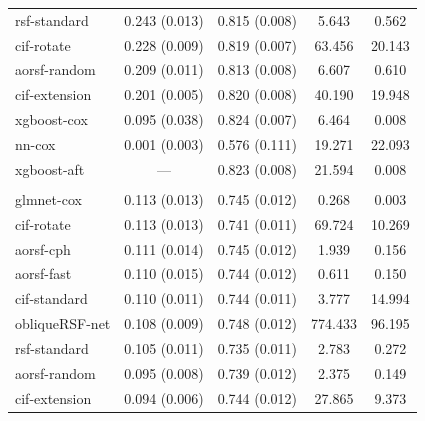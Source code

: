 \documentclass[12pt]{article}\usepackage[]{graphicx}\usepackage[]{xcolor}
\newenvironment{knitrout}{}{} %
\begin{document}
\begin{knitrout}
\begin{longtable}[t]{lcccc}
\hspace{1em}rsf-standard & 0.243 (0.013) & 0.815 (0.008) & 5.643 & 0.562\\
\hspace{1em}cif-rotate & 0.228 (0.009) & 0.819 (0.007) & 63.456 & 20.143\\
\hspace{1em}aorsf-random & 0.209 (0.011) & 0.813 (0.008) & 6.607 & 0.610\\
\hspace{1em}cif-extension & 0.201 (0.005) & 0.820 (0.008) & 40.190 & 19.948\\
\hspace{1em}xgboost-cox & 0.095 (0.038) & 0.824 (0.007) & 6.464 & 0.008\\
\hspace{1em}nn-cox & 0.001 (0.003) & 0.576 (0.111) & 19.271 & 22.093\\
\hspace{1em}xgboost-aft & --- & 0.823 (0.008) & 21.594 & 0.008\\
\addlinespace[0.3em]
\multicolumn{5}{l}{\textit{\textbf{Systolic Heart Failure; death, n = 2231, p = 41}}}\\
\hline
\hspace{1em}glmnet-cox & 0.113 (0.013) & 0.745 (0.012) & 0.268 & 0.003\\
\hspace{1em}cif-rotate & 0.113 (0.013) & 0.741 (0.011) & 69.724 & 10.269\\
\hspace{1em}aorsf-cph & 0.111 (0.014) & 0.745 (0.012) & 1.939 & 0.156\\
\hspace{1em}aorsf-fast & 0.110 (0.015) & 0.744 (0.012) & 0.611 & 0.150\\
\hspace{1em}cif-standard & 0.110 (0.011) & 0.744 (0.011) & 3.777 & 14.994\\
\hspace{1em}obliqueRSF-net & 0.108 (0.009) & 0.748 (0.012) & 774.433 & 96.195\\
\hspace{1em}rsf-standard & 0.105 (0.011) & 0.735 (0.011) & 2.783 & 0.272\\
\hspace{1em}aorsf-random & 0.095 (0.008) & 0.739 (0.012) & 2.375 & 0.149\\
\hspace{1em}cif-extension & 0.094 (0.006) & 0.744 (0.012) & 27.865 & 9.373\\

\end{longtable}
\end{knitrout}
\end{document}
